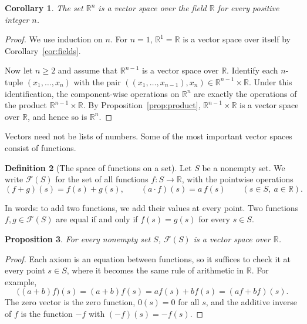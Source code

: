 \documentclass[11pt]{article}
\theoremstyle{definition}
\newtheorem{definition}{Definition}[section]
\theoremstyle{plain}
\newtheorem{proposition}[definition]{Proposition}
\newtheorem{corollary}[definition]{Corollary}
\theoremstyle{remark}
\begin{document}
\begin{corollary}
    The set $\mathbb{R}^n$ is a vector space over the field $\mathbb{R}$ for every positive integer $n$.
\end{corollary}

\begin{proof}
    We use induction on $n$. For $n = 1$, $\mathbb{R}^1 = \mathbb{R}$ is a vector space over itself by Corollary~\ref{cor:fields}.

    Now let $n \geq 2$ and assume that $\mathbb{R}^{n-1}$ is a vector space over $\mathbb{R}$. Identify each $n$-tuple $(x_1, \ldots, x_n)$ with the pair $((x_1, \ldots, x_{n-1}), x_n) \in \mathbb{R}^{n-1} \times \mathbb{R}$. Under this identification, the component-wise operations on $\mathbb{R}^n$ are exactly the operations of the product $\mathbb{R}^{n-1} \times \mathbb{R}$. By Proposition~\ref{prop:product}, $\mathbb{R}^{n-1} \times \mathbb{R}$ is a vector space over $\mathbb{R}$, and hence so is $\mathbb{R}^n$.
\end{proof}

Vectors need not be lists of numbers. Some of the most important vector spaces consist of functions.

\begin{definition}[The space of functions on a set]\label{def:function-space}
    Let $S$ be a nonempty set. We write $\mathcal{F}(S)$ for the set of all functions $f: S \to \mathbb{R}$, with the pointwise operations
    \[(f + g)(s) = f(s) + g(s), \qquad (a \cdot f)(s) = a\, f(s) \qquad (s \in S, \ a \in \mathbb{R}).\]
\end{definition}

In words: to add two functions, we add their values at every point. Two functions $f, g \in \mathcal{F}(S)$ are equal if and only if $f(s) = g(s)$ for every $s \in S$.

\begin{proposition}\label{prop:function-space}
    For every nonempty set $S$, $\mathcal{F}(S)$ is a vector space over $\mathbb{R}$.
\end{proposition}

\begin{proof}
    Each axiom is an equation between functions, so it suffices to check it at every point $s \in S$, where it becomes the same rule of arithmetic in $\mathbb{R}$. For example,
    \[\big((a + b)f\big)(s) = (a + b)f(s) = af(s) + bf(s) = (af + bf)(s).\]
    The zero vector is the zero function, $0(s) = 0$ for all $s$, and the additive inverse of $f$ is the function $-f$ with $(-f)(s) = -f(s)$.
\end{proof}
\end{document}
